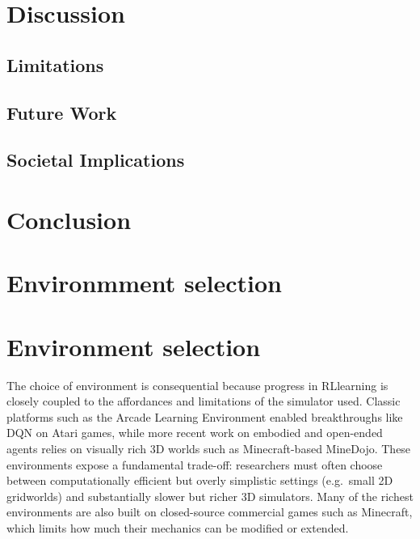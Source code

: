 \documentclass{article}
\theoremstyle{plain}
\theoremstyle{definition}
\theoremstyle{remark}
\begin{document}
\section{Discussion }
\label{disc}
\subsection{Limitations}
\subsection{Future Work}
\subsection{Societal Implications}

\section{Conclusion}
\label{concl}






\newpage
\appendix
\onecolumn
\section{Environmment selection}
\label{sec:env_selection}

\section{Environment selection}
\label{sec:env_selection}

The choice of environment is consequential because progress in RLlearning is closely coupled to the affordances and limitations of the simulator used. Classic platforms such as the Arcade Learning Environment enabled breakthroughs like DQN on Atari games, while more recent work on embodied and open-ended agents relies on visually rich 3D worlds such as Minecraft-based MineDojo. These environments expose a fundamental trade-off: researchers must often choose between computationally efficient but overly simplistic settings (e.g.\ small 2D gridworlds) and substantially slower but richer 3D simulators. Many of the richest environments are also built on closed-source commercial games such as Minecraft, which limits how much their mechanics can be modified or extended.
\end{document}
